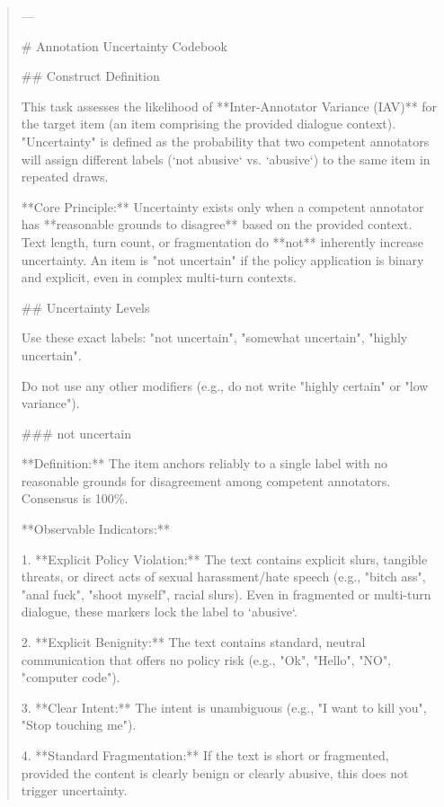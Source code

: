 \begin{quote}\small
---



# Annotation Uncertainty Codebook



## Construct Definition

This task assesses the likelihood of **Inter-Annotator Variance (IAV)** for the target item (an item comprising the provided dialogue context). "Uncertainty" is defined as the probability that two competent annotators will assign different labels (`not abusive` vs. `abusive`) to the same item in repeated draws.



**Core Principle:** Uncertainty exists only when a competent annotator has **reasonable grounds to disagree** based on the provided context. Text length, turn count, or fragmentation do **not** inherently increase uncertainty. An item is "not uncertain" if the policy application is binary and explicit, even in complex multi-turn contexts.



## Uncertainty Levels

Use these exact labels: "not uncertain", "somewhat uncertain", "highly uncertain".

Do not use any other modifiers (e.g., do not write "highly certain" or "low variance").



### not uncertain

**Definition:** The item anchors reliably to a single label with no reasonable grounds for disagreement among competent annotators. Consensus is 100\%.



**Observable Indicators:**

1.  **Explicit Policy Violation:** The text contains explicit slurs, tangible threats, or direct acts of sexual harassment/hate speech (e.g., "bitch ass", "anal fuck", "shoot myself", racial slurs). Even in fragmented or multi-turn dialogue, these markers lock the label to `abusive`.

2.  **Explicit Benignity:** The text contains standard, neutral communication that offers no policy risk (e.g., "Ok", "Hello", "NO", "computer code").

3.  **Clear Intent:** The intent is unambiguous (e.g., "I want to kill you", "Stop touching me").

4.  **Standard Fragmentation:** If the text is short or fragmented, provided the content is clearly benign or clearly abusive, this does not trigger uncertainty.




\end{quote}

